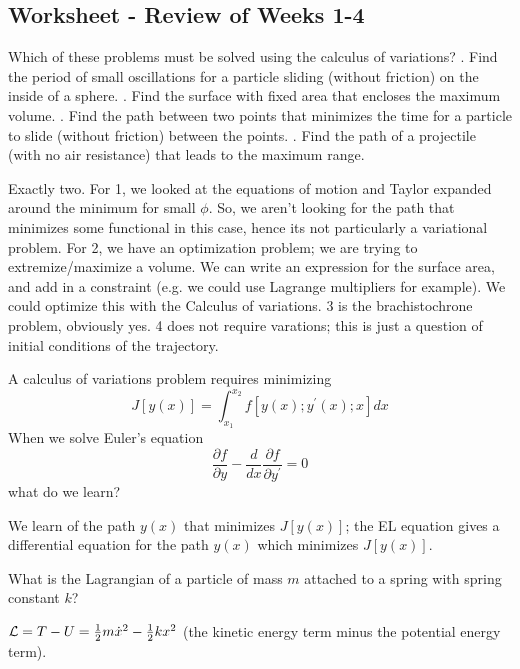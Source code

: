 \subsection{Worksheet - Review of Weeks 1-4}
\begin{p}
Which of these problems must be solved using the calculus of variations?
. Find the period of small oscillations for a particle sliding (without friction) on the inside of a sphere.
. Find the surface with fixed area that encloses the maximum volume.
. Find the path between two points that minimizes the time for a particle to slide (without friction) between the points.
. Find the path of a projectile (with no air resistance) that leads to the maximum range.
\end{p}
\begin{s}
Exactly two. For 1, we looked at the equations of motion and Taylor expanded around the minimum for small $\phi$. So, we aren't looking for the path that minimizes some functional in this case, hence its not particularly a variational problem. For 2, we have an optimization problem; we are trying to extremize/maximize a volume. We can write an expression for the surface area, and add in a constraint (e.g. we could use Lagrange multipliers for example). We could optimize this with the Calculus of variations. 3 is the brachistochrone problem, obviously yes. 4 does not require varations; this is just a question of initial conditions of the trajectory.
\end{s}

\begin{p}
A calculus of variations problem requires minimizing
$$
J[y(x)]=\int_{x_{1}}^{x_{2}} f\left[y(x) ; y^{\prime}(x) ; x\right] d x
$$
When we solve Euler's equation
$$
\frac{\partial f}{\partial y}-\frac{d}{d x} \frac{\partial f}{\partial y^{\prime}}=0
$$
what do we learn?
\end{p}
\begin{s}
We learn of the path $y(x)$ that minimizes $J[y(x)]$; the EL equation gives a differential equation for the path $y(x)$ which minimizes $J[y(x)]$.
\end{s}

\begin{p}
What is the Lagrangian of a particle of mass $m$ attached to a spring with spring constant $k$?
\end{p}
\begin{s}
$\mathcal{L} = T - U = \frac{1}{2}m\dot{x}^2 - \frac{1}{2}kx^2$ (the kinetic energy term minus the potential energy term).
\end{s}

